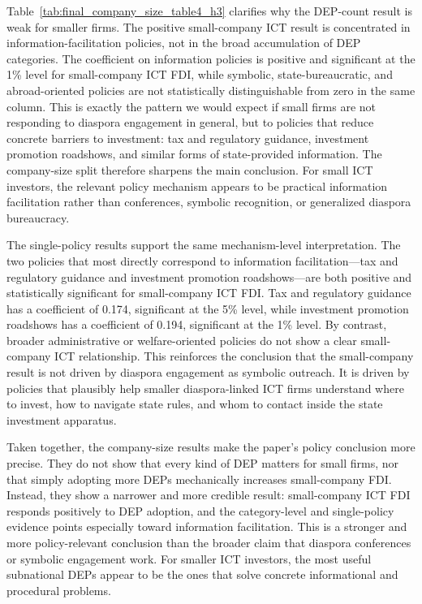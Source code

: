 \documentclass[doublespace,nopageskip]{UVAthesis}
\begin{document}


Table~\ref{tab:final_company_size_table4_h3} clarifies why the DEP-count result is weak for smaller firms. The positive small-company ICT result is concentrated in information-facilitation policies, not in the broad accumulation of DEP categories. The coefficient on information policies is positive and significant at the 1\% level for small-company ICT FDI, while symbolic, state-bureaucratic, and abroad-oriented policies are not statistically distinguishable from zero in the same column. This is exactly the pattern we would expect if small firms are not responding to diaspora engagement in general, but to policies that reduce concrete barriers to investment: tax and regulatory guidance, investment promotion roadshows, and similar forms of state-provided information. The company-size split therefore sharpens the main conclusion. For small ICT investors, the relevant policy mechanism appears to be practical information facilitation rather than conferences, symbolic recognition, or generalized diaspora bureaucracy.



The single-policy results support the same mechanism-level interpretation. The two policies that most directly correspond to information facilitation---tax and regulatory guidance and investment promotion roadshows---are both positive and statistically significant for small-company ICT FDI. Tax and regulatory guidance has a coefficient of 0.174, significant at the 5\% level, while investment promotion roadshows has a coefficient of 0.194, significant at the 1\% level. By contrast, broader administrative or welfare-oriented policies do not show a clear small-company ICT relationship. This reinforces the conclusion that the small-company result is not driven by diaspora engagement as symbolic outreach. It is driven by policies that plausibly help smaller diaspora-linked ICT firms understand where to invest, how to navigate state rules, and whom to contact inside the state investment apparatus.

Taken together, the company-size results make the paper's policy conclusion more precise. They do not show that every kind of DEP matters for small firms, nor that simply adopting more DEPs mechanically increases small-company FDI. Instead, they show a narrower and more credible result: small-company ICT FDI responds positively to DEP adoption, and the category-level and single-policy evidence points especially toward information facilitation. This is a stronger and more policy-relevant conclusion than the broader claim that diaspora conferences or symbolic engagement work. For smaller ICT investors, the most useful subnational DEPs appear to be the ones that solve concrete informational and procedural problems.
\end{document}
